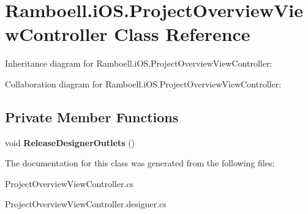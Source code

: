 \hypertarget{class_ramboell_1_1i_o_s_1_1_project_overview_view_controller}{}\section{Ramboell.\+i\+O\+S.\+Project\+Overview\+View\+Controller Class Reference}
\label{class_ramboell_1_1i_o_s_1_1_project_overview_view_controller}


Inheritance diagram for Ramboell.\+i\+O\+S.\+Project\+Overview\+View\+Controller\+:


Collaboration diagram for Ramboell.\+i\+O\+S.\+Project\+Overview\+View\+Controller\+:
\subsection*{Private Member Functions}
\begin{DoxyCompactItemize}
\item 
\mbox{\label{class_ramboell_1_1i_o_s_1_1_project_overview_view_controller_a4d8d54b447075d9c398a34a33eafb91d}} 
void {\bfseries Release\+Designer\+Outlets} ()
\end{DoxyCompactItemize}


The documentation for this class was generated from the following files\+:\begin{DoxyCompactItemize}
\item 
Project\+Overview\+View\+Controller.\+cs\item 
Project\+Overview\+View\+Controller.\+designer.\+cs\end{DoxyCompactItemize}
